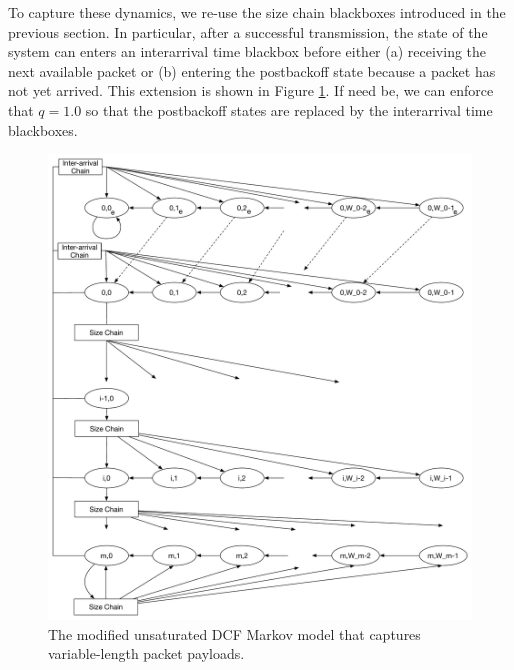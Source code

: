 \documentclass[conference]{IEEEtran}
\begin{document}
To capture these dynamics, we re-use the size chain blackboxes introduced in the previous section. In particular, after a successful transmission, the state of the system can enters an interarrival time blackbox before either (a) receiving the next available packet or (b) entering the postbackoff state because a packet has not yet arrived. This extension is shown in Figure \ref{fig:dcf_model_unsaturated_varpktsize_interarrival}. If need be, we can enforce that $q = 1.0$ so that the postbackoff states are replaced by the interarrival time blackboxes. 


\begin{figure}
\begin{center}
\includegraphics[scale=0.5]{../sketches/dcf_model_unsaturated_varpktsize_interarrival.pdf}
\caption{The modified unsaturated DCF Markov model that captures variable-length packet payloads.}
\label{fig:dcf_model_unsaturated_varpktsize_interarrival}
\end{center}
\end{figure}




\end{document}
